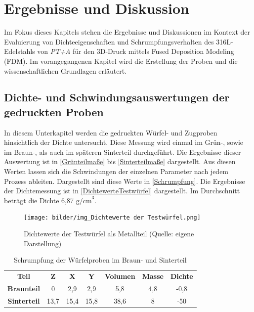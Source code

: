 \chapter{Ergebnisse und Diskussion}

Im Fokus dieses Kapitels stehen die Ergebnisse und Diskussionen im Kontext der Evaluierung von Dichteeigenschaften und Schrumpfungsverhalten des 316L-Edelstahls von \textit{PT+A} für den 3D-Druck mittels Fused Deposition Modeling (FDM). Im vorangegangenen Kapitel wird die Erstellung der Proben und die wissenschaftlichen Grundlagen erläutert.

\section{Dichte- und Schwindungsauswertungen der gedruckten Proben}
\label{Dichte- und Schwindung}
In diesem Unterkapitel werden die gedruckten Würfel- und Zugproben hinsichtlich der Dichte untersucht. Diese Messung wird einmal im Grün-, sowie im Braun-, als auch im späteren Sinterteil durchgeführt. Die Ergebnisse dieser Auswertung ist in \autoref{Grünteilmaße} bis \autoref{Sinterteilmaße} dargestellt.
Aus diesen Werten lassen sich die Schwindungen der einzelnen Parameter nach jedem Prozess ableiten. Dargestellt sind diese Werte in \autoref{Schrumpfung}.
Die Ergebnisse der Dichtemessung ist in \autoref{DichtewerteTestwürfel} dargestellt. Im Durchschnitt beträgt die Dichte 6,87 \(\text{g/cm}^3\).

\begin{figure}[h] 
  \centering
  \texttt{[image: bilder/img\_Dichtewerte der Testwürfel.png]}
        \caption[Dichtewerte der Testwürfel als Metallteil] {Dichtewerte der Testwürfel als Metallteil (Quelle: eigene Darstellung)}
  \label{DichtewerteTestwürfel}
\end{figure}


\begin{table}[h]
    \centering
    \caption{Schrumpfung der Würfelproben im Braun- und Sinterteil}
      \begin{tabular}{ccccccc}
      \toprule
      \textbf{Teil} & \multicolumn{1}{c}{\textbf{Z}} & \multicolumn{1}{c}{\textbf{X}} & \multicolumn{1}{c}{\textbf{Y}} & \multicolumn{1}{c}{\textbf{Volumen}} & \multicolumn{1}{c}{\textbf{Masse}} & \multicolumn{1}{c}{\textbf{Dichte}} \\
        \textbf{Braunteil} & 0 & 2,9 & 2,9 & 5,8 & 4,8 & -0,8 \\
        \textbf{Sinterteil} & 13,7 & 15,4 & 15,8 & 38,6 & 8 & -50 \\
      \bottomrule
      \end{tabular}%
    \label{Schrumpfung}%
  \end{table}%
  \FloatBarrier

